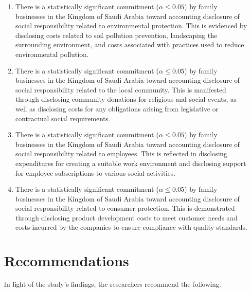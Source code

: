 \documentclass[10pt]{NSP1}
\begin{document}
\begin{enumerate}
    \item There is a statistically significant commitment ($\alpha \leq 0.05$) by family businesses in the Kingdom of Saudi Arabia toward accounting disclosure of social responsibility related to environmental protection. This is evidenced by disclosing costs related to soil pollution prevention, landscaping the surrounding environment, and costs associated with practices used to reduce environmental pollution.
    \item There is a statistically significant commitment ($\alpha \leq 0.05$) by family businesses in the Kingdom of Saudi Arabia toward accounting disclosure of social responsibility related to the local community. This is manifested through disclosing community donations for religious and social events, as well as disclosing costs for any obligations arising from legislative or contractual social requirements.
    \item There is a statistically significant commitment ($\alpha \leq 0.05$) by family businesses in the Kingdom of Saudi Arabia toward accounting disclosure of social responsibility related to employees. This is reflected in disclosing expenditures for creating a suitable work environment and disclosing support for employee subscriptions to various social activities.
    \item There is a statistically significant commitment ($\alpha \leq 0.05$) by family businesses in the Kingdom of Saudi Arabia toward accounting disclosure of social responsibility related to consumer protection. This is demonstrated through disclosing product development costs to meet customer needs and costs incurred by the companies to ensure compliance with quality standards.
\end{enumerate}

\section{Recommendations}

In light of the study's findings, the researchers recommend the following:
\end{document}
